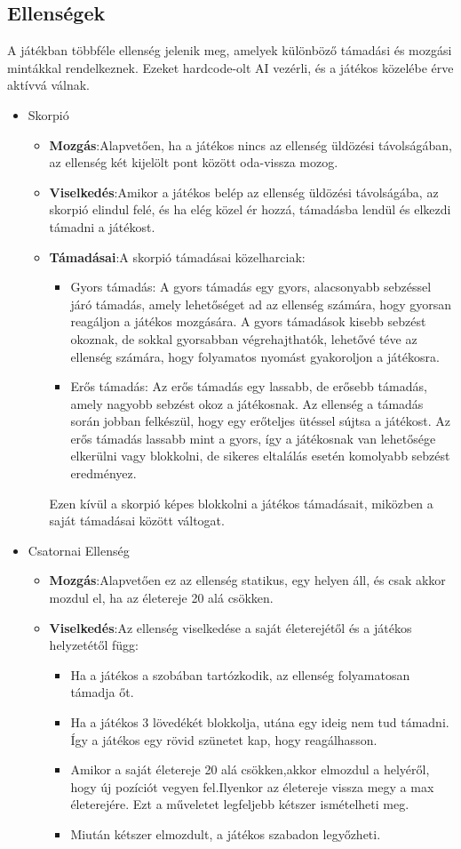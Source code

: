 \documentclass[
]{thesis-ekf}
\theoremstyle{definition}
\theoremstyle{remark}
\begin{document}
\subsection{Ellenségek}

A játékban többféle ellenség jelenik meg, amelyek különböző támadási és mozgási mintákkal rendelkeznek. Ezeket hardcode-olt AI vezérli, és a játékos közelébe érve aktívvá válnak.
\begin{itemize}
	\item Skorpió
	\begin{itemize}
		\item \textbf{Mozgás}:Alapvetően, ha a játékos nincs az ellenség üldözési távolságában, az ellenség két kijelölt pont között oda-vissza mozog.
		\item \textbf{Viselkedés}:Amikor a játékos belép az ellenség üldözési távolságába, az skorpió elindul felé, és ha elég közel ér hozzá, támadásba lendül és elkezdi támadni a játékost.
		\item \textbf{Támadásai}:A skorpió támadásai közelharciak:
		\begin{itemize}
			\item Gyors támadás: A gyors támadás egy gyors, alacsonyabb sebzéssel járó támadás, amely lehetőséget ad az ellenség számára, hogy gyorsan reagáljon a játékos mozgására. A gyors támadások kisebb sebzést okoznak, de sokkal gyorsabban végrehajthatók, lehetővé téve az ellenség számára, hogy folyamatos nyomást gyakoroljon a játékosra. 
			\item Erős támadás: Az erős támadás egy lassabb, de erősebb támadás, amely nagyobb sebzést okoz a játékosnak. Az ellenség a támadás során jobban felkészül, hogy egy erőteljes ütéssel sújtsa a játékost. Az erős támadás lassabb mint a gyors, így a játékosnak van lehetősége elkerülni vagy blokkolni, de sikeres eltalálás esetén komolyabb sebzést eredményez.
		\end{itemize}
		Ezen kívül a skorpió képes blokkolni a játékos támadásait, miközben a saját támadásai között váltogat.
	\end{itemize}
	\item Csatornai Ellenség
	\begin{itemize}
		\item \textbf{Mozgás}:Alapvetően ez az ellenség statikus, egy helyen áll, és csak akkor mozdul el, ha az életereje 20 alá csökken.
		\item \textbf{Viselkedés}:Az ellenség viselkedése a saját életerejétől és a játékos helyzetétől függ:
		\begin{itemize}
			\item Ha a játékos a szobában tartózkodik, az ellenség folyamatosan támadja őt.
			\item Ha a játékos 3 lövedékét blokkolja, utána egy ideig nem tud támadni. Így a játékos egy rövid szünetet kap, hogy reagálhasson.
			\item Amikor a saját életereje 20 alá csökken,akkor elmozdul a helyéről, hogy új pozíciót vegyen fel.Ilyenkor az életereje vissza megy a max életerejére. Ezt a műveletet legfeljebb kétszer ismételheti meg.
			\item Miután kétszer elmozdult, a játékos szabadon legyőzheti.
			

\end{itemize}
\end{itemize}
\end{itemize}
\end{document}
